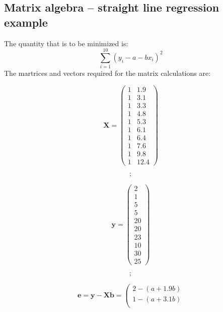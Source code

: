 \subsection{Matrix algebra -- straight line regression example}
The quantity that is to be minimized is:
\[\sum_{i=1}^{10} (y_i - a - b x_i)^2\]
The martrices and vectors required for the matrix calculations are:
\begin{fullwidth}
\begin{minipage}[c]{0.25\textwidth}
\[
\mathbf{X} = \left( \begin{array}{cc}
  1 & 1.9\\
  1 & 3.1\\
  1 & 3.3\\
  1 & 4.8\\
  1 & 5.3\\
  1 & 6.1\\
  1 & 6.4\\
  1 & 7.6\\
  1 & 9.8\\
  1 & 12.4
\end{array} \right)
\]
    \end{minipage}
\begin{minipage}[c]{0.015\textwidth}
\[\mathbf{;}\]
\end{minipage}
\hspace{0.025\textwidth}
    \begin{minipage}[c]{0.18\textwidth}
\[
\mathbf{y} = \left( \begin{array}{c}
  2\\
  1\\
  5\\
  5\\
 20\\
 20\\
 23\\
 10\\
 30\\
 25
\end{array} \right)
\]
    \end{minipage}
    \begin{minipage}[c]{0.015\textwidth}
\[\mathbf{;}\]
\end{minipage}\hspace{0.05\textwidth}
\begin{minipage}[c]{0.44\textwidth}
\[\mathbf{e} = \mathbf{y} - \mathbf{X} \mathbf{b} =
\left( \begin{array}{c}
  2  - (a + 1.9 b)\\
  1  - (a + 3.1 b)\\

\end{array}\]
\end{minipage}
\end{fullwidth}
